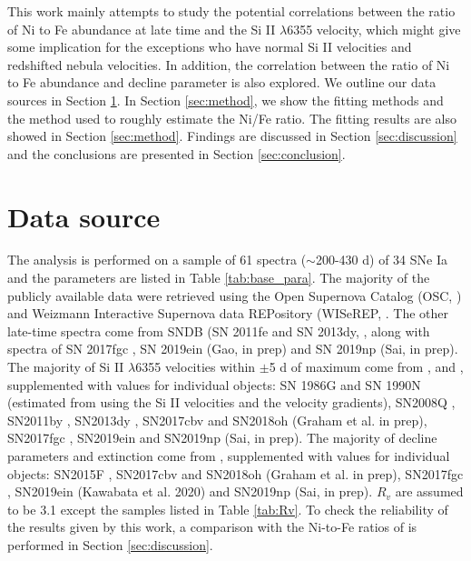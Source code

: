 \documentclass[twocolumn]{aastex631}
\begin{document}
This work mainly attempts to study the potential correlations between the ratio of Ni to Fe abundance at late time and the Si II $\lambda$6355 velocity, which might give some implication for the exceptions who have normal Si II velocities and redshifted nebula velocities. In addition, the correlation between the ratio of Ni to Fe abundance and decline parameter is also explored. We outline our data sources in Section \ref{sec:source}. In Section \ref{sec:method}, we show the fitting methods and the method used to roughly estimate the Ni/Fe ratio. The fitting results are also showed in Section \ref{sec:method}. Findings are discussed in Section \ref{sec:discussion} and the conclusions are presented in Section \ref{sec:conclusion}.

\section{Data source} \label{sec:source}

The analysis is performed on a sample of 61 spectra ($\sim$200-430 d) of 34 SNe Ia and the parameters are listed in Table \ref{tab:base_para}. The majority of the publicly available data were retrieved using the Open Supernova Catalog (OSC, \citealt{2017ApJ...835...64G}) and Weizmann Interactive Supernova data REPository (WISeREP, \citealt{2012PASP..124..668Y}. The other late-time spectra come from SNDB (SN 2011fe and SN 2013dy, \citep{2020MNRAS.492.4325S}, along with spectra of SN 2017fgc \citep{2021ApJ...919...49Z}, SN 2019ein (Gao, in prep) and SN 2019np (Sai, in prep). The majority of Si II $\lambda$6355 velocities within $\pm$5 d of maximum come from \citet{2019ApJ...882..120W}, \citet{2017MNRAS.472.3437G} and \citet{2018MNRAS.477.3567M}, supplemented with values for individual objects: SN 1986G and SN 1990N (estimated from \citep{2005ApJ...623.1011B} using the Si II velocities and the velocity gradients), SN2008Q \citep{2013MNRAS.430.1030S}, SN2011by \citep{2014MNRAS.443.2887F}, SN2013dy \citep{2015MNRAS.452.4307P}, SN2017cbv and SN2018oh (Graham et al. in prep), SN2017fgc \citep{2021MNRAS.502.4112B}, SN2019ein \citep{2020ApJ...893..143K} and SN2019np (Sai, in prep). The majority of decline parameters and extinction come from \citet{2020MNRAS.493.1044T}, supplemented with values for individual objects: SN2015F \citep{2017MNRAS.472.3437G}, SN2017cbv and SN2018oh (Graham et al. in prep), SN2017fgc \citep{2021MNRAS.502.4112B}, SN2019ein \citep{2020ApJ...893..143K}(Kawabata et al. 2020) and SN2019np (Sai, in prep). $R_v$ are assumed to be 3.1 except the samples listed in Table \ref{tab:Rv}. To check the reliability of the results given by this work, a comparison with the Ni-to-Fe ratios of \citet{2020MNRAS.491.2902F} is performed in Section \ref{sec:discussion}.
\end{document}
